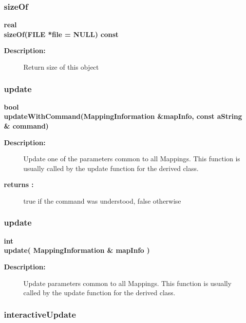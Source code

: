 \subsubsection{sizeOf}
 
\begin{flushleft} \textbf{%
real  \\ 
\settowidth{\MappingIncludeArgIndent}{sizeOf(}%
sizeOf(FILE *file  = NULL) const
}\end{flushleft}
\begin{description}
\item[{\bf Description:}] 
   Return size of this object  
\end{description}
\subsubsection{update}
 
\begin{flushleft} \textbf{%
bool  \\ 
\settowidth{\MappingIncludeArgIndent}{updateWithCommand(}%
updateWithCommand(MappingInformation \&mapInfo, const aString \& command) 
}\end{flushleft}
\begin{description}
\item[{\bf Description:}] 
   Update one of the parameters common to all Mappings. This function is usually called by the update
 function for the derived class. 
\item[{\bf returns :}]  true if the command was understood, false otherwise
\end{description}
\subsubsection{update}
 
\begin{flushleft} \textbf{%
int  \\ 
\settowidth{\MappingIncludeArgIndent}{update(}%
update( MappingInformation \& mapInfo ) 
}\end{flushleft}
\begin{description}
\item[{\bf Description:}] 
   Update parameters common to all Mappings. This function is usually called by the update
 function for the derived class. 
\end{description}
\subsubsection{interactiveUpdate}
 
